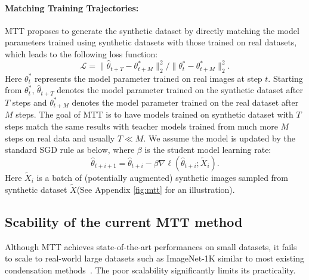 \documentclass[10pt,twocolumn,letterpaper]{article}
\begin{document}
\paragraph{Matching Training Trajectories:}
MTT \cite{cazenavette2022dataset} proposes to generate the synthetic dataset by directly matching the model parameters trained using synthetic datasets with those trained on real datasets, which leads to the following loss function: 
\begin{equation}
    \label{eq:tm_loss}
    \mathcal{L} = \| \hat{\theta}_{t+T} - \theta_{t+M}^* \|^2_2 / \| \theta_t^{*} - \theta_{t+M}^* \|_2^2.
\end{equation}
Here $\theta_t^*$ represents the model parameter trained on real images at step $t$. Starting from $\theta_t^*$, 
 $\hat{\theta}_{t+T}$ denotes the model parameter trained on the synthetic dataset after $T$ steps and $\theta^*_{t+M}$ denotes the model parameter trained on the real dataset after $M$ steps. The goal of MTT is to have models trained on synthetic dataset with $T$ steps match the same results with teacher models trained from much more $M$ steps on real data and usually $T\ll M$.
We assume the model is updated by the standard SGD rule as below, where $\beta$ is the student model learning rate: 
\begin{equation}
\label{eq:tm_update}
\hat{\theta}_{t+i+1} = \hat{\theta}_{t+i} - \beta\nabla\ell(\hat{\theta}_{t+i}; \tilde{X}_{i}). 
\end{equation}
Here $\tilde{X}_{i}$ is a batch of (potentially augmented) synthetic images sampled from synthetic dataset $\tilde{X}$(See Appendix \cref{fig:mtt} for an illustration). 

\subsection{Scability of the current MTT method}
Although MTT achieves state-of-the-art performances on small datasets, it fails to scale to real-world large datasets such as ImageNet-1K similar to most existing condensation methods~\cite{zhaodsa, zhaodm, nguyen2020dataset, nguyen2021dataset, wang2022cafe}. The poor scalability significantly limits its practicality.
\end{document}
